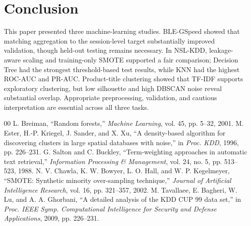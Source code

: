 \documentclass[conference]{IEEEtran}
\begin{document}
\section{Conclusion}
This paper presented three machine-learning studies. BLE-GSpeed showed that matching aggregation to the session-level target substantially improved validation, though held-out testing remains necessary. In NSL-KDD, leakage-aware scaling and training-only SMOTE supported a fair comparison; Decision Tree had the strongest threshold-based test results, while KNN had the highest ROC-AUC and PR-AUC. Product-title clustering showed that TF-IDF supports exploratory clustering, but low silhouette and high DBSCAN noise reveal substantial overlap. Appropriate preprocessing, validation, and cautious interpretation are essential across all three tasks.

\clearpage
\balance
\begin{thebibliography}{00}
 L. Breiman, ``Random forests,'' \emph{Machine Learning}, vol. 45, pp. 5--32, 2001.
 M. Ester, H.-P. Kriegel, J. Sander, and X. Xu, ``A density-based algorithm for discovering clusters in large spatial databases with noise,'' in \emph{Proc. KDD}, 1996, pp. 226--231.
 G. Salton and C. Buckley, ``Term-weighting approaches in automatic text retrieval,'' \emph{Information Processing \& Management}, vol. 24, no. 5, pp. 513--523, 1988.
 N. V. Chawla, K. W. Bowyer, L. O. Hall, and W. P. Kegelmeyer, ``SMOTE: Synthetic minority over-sampling technique,'' \emph{Journal of Artificial Intelligence Research}, vol. 16, pp. 321--357, 2002.
 M. Tavallaee, E. Bagheri, W. Lu, and A. A. Ghorbani, ``A detailed analysis of the KDD CUP 99 data set,'' in \emph{Proc. IEEE Symp. Computational Intelligence for Security and Defense Applications}, 2009, pp. 226--231.
\end{thebibliography}
\end{document}
